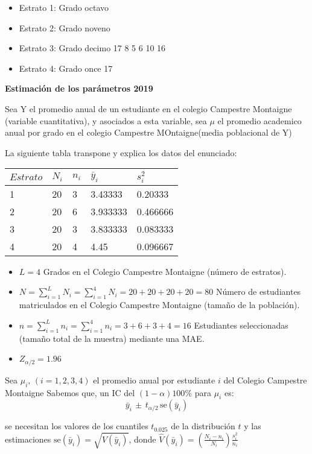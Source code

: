\documentclass[
]{article}
\providecommand{\tightlist}{%
  \setlength{\itemsep}{0pt}\setlength{\parskip}{0pt}}
\begin{document}
\begin{itemize}
\tightlist
\item
  Estrato 1: Grado octavo\\
\item
  Estrato 2: Grado noveno
\item
  Estrato 3: Grado decimo 17 8 5 6 10 16
\item
  Estrato 4: Grado once 17
\end{itemize}

\newpage
\begin{center}
\textbf{Estimación de los parámetros 2019}
\end{center}

Sea Y el promedio anual de un estudiante en el colegio Campestre
Montaigne (variable cuantitativa), y asociados a esta variable, sea
\(\mu\) el promedio academico anual por grado en el colegio Campestre
MOntaigne(media poblacional de Y)

La siguiente tabla transpone y explica los datos del enunciado:

\begin{longtable}[]{@{}lllll@{}}
\toprule
\(Estrato\) & \(N_i\) & \(n_i\) & \(\bar{y}_i\) &
\(s_i^2\)\tabularnewline
\midrule
\endhead
1 & 20 & 3 & 3.43333 & 0.20333\tabularnewline
2 & 20 & 6 & 3.933333 & 0.466666\tabularnewline
3 & 20 & 3 & 3.833333 & 0.083333\tabularnewline
4 & 20 & 4 & 4.45 & 0.096667\tabularnewline
\bottomrule
\end{longtable}

\begin{itemize}
\item
  \(L = 4\) Grados en el Colegio Campestre Montaigne (número de
  estratos).
\item
  \(N = \sum_{i = 1}^L N_i = \sum_{i = 1}^4 N_i = 20 + 20 + 20 + 20 = 80\)
  Número de estudiantes matriculados en el Colegio Campestre Montaigne
  (tamaño de la población).
\item
  \(n = \sum_{i = 1}^L n_i = \sum_{i = 1}^4 n_i = 3 + 6 + 3+ 4 = 16\)
  Estudiantes seleccionadas (tamaño total de la muestra) mediante una
  MAE.
\item
  \(Z_{\alpha/2}= 1.96\)
\end{itemize}

Sea \(\mu_i,\, (i=1,2,3,4)\) el promedio anual por estudiante \(i\) del
Colegio Campestre Montaigne Sabemos que, un IC del \((1 - \alpha)100\%\)
para \(\mu_i\) es:
\[\bar{y}_i \,\pm\, t_{\alpha/2}\, \text{se}(\bar{y}_i)\]

se necesitan los valores de los cuantiles \(t_{0.025}\) de la
distribución \(t\) y las estimaciones
\(\text{se}(\bar{y}_i) = \sqrt{\widehat{V}(\bar{y}_i)}\), donde
\(\widehat{V}(\bar{y}_i) = (\frac{N_i - n_i}{N_i})\frac{s_i^2}{n_i}\)
\end{document}
